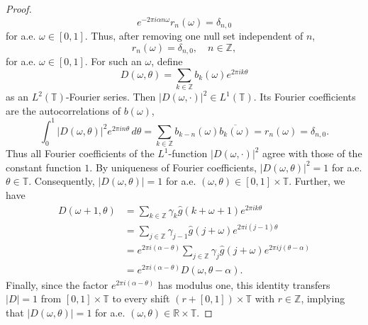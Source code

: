 \documentclass[10pt,a4paper]{amsart}
\def\T{{\mathbb T}}
\begin{document}
\begin{proof}
$$e^{-2\pi i\alpha n\omega}r_n(\omega)=\delta_{n,0}
$$
for a.e. $\omega\in[0,1]$. Thus, after removing one null set independent of $n$,
$$
r_n(\omega)=\delta_{n,0}, \quad n \in \mathbb Z,
$$
for a.e. $\omega\in[0,1]$.
For such an $\omega$, define
$$
D(\omega,\theta) = \sum_{k\in\mathbb Z}b_k(\omega)e^{2\pi i k\theta}
$$
as an $L^2(\T)$-Fourier series. Then $|D(\omega,\cdot)|^2\in L^1(\T)$. Its Fourier coefficients are the autocorrelations of $b(\omega)$,
$$
\int_0^1 |D(\omega,\theta)|^2e^{2\pi i n\theta}\,d\theta = \sum_{k\in\mathbb Z} b_{k-n}(\omega)\overline{b_k(\omega)} = r_n(\omega) = \delta_{n,0}.
$$
Thus all Fourier coefficients of the $L^1$-function $|D(\omega,\cdot)|^2$ agree with those of the constant function $1$. By uniqueness of Fourier coefficients, $|D(\omega,\theta)|^2=1$ for a.e. $\theta\in \T $. Consequently, $|D(\omega,\theta)|=1$ for a.e. $(\omega,\theta)\in[0,1]\times \T$.
Further, we have
$$
\begin{aligned}
D(\omega+1,\theta)
&=
\sum_{k\in\mathbb Z}
\gamma_k\widehat g(k+\omega+1)e^{2\pi i k\theta}  \\
&=
\sum_{j\in\mathbb Z}
\gamma_{j-1}\widehat g(j+\omega)e^{2\pi i(j-1)\theta}  \\
&=
e^{2\pi i(\alpha-\theta)}
\sum_{j\in\mathbb Z}
\gamma_j\widehat g(j+\omega)e^{2\pi i j(\theta-\alpha)}  \\
&=
e^{2\pi i(\alpha-\theta)}D(\omega,\theta-\alpha).
\end{aligned}
$$
Finally, since the factor $e^{2\pi i(\alpha-\theta)}$ has modulus one, this identity transfers $|D|=1$ from $[0,1]\times \T$ to every shift $(r+[0,1])\times \T$ with $r\in\mathbb Z$, implying that $|D(\omega,\theta)|=1$ for a.e. $(\omega,\theta)\in\mathbb R\times \T$.
\end{proof}
\end{document}

